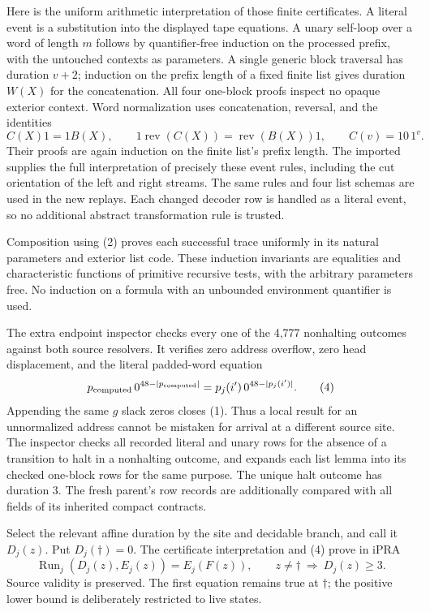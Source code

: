 \documentclass[11pt]{article}
\newcommand{\Run}{\operatorname{Run}}
\begin{document}
Here is the uniform arithmetic interpretation of those finite
certificates. A literal event is a substitution into the displayed
tape equations. A unary self-loop over a word of length $m$ follows by
quantifier-free induction on the processed prefix, with the untouched
contexts as parameters. A single generic block traversal has duration
$v+2$; induction on the prefix length of a fixed finite list gives
duration $W(X)$ for the concatenation. All four one-block proofs inspect
no opaque exterior context. Word normalization uses concatenation,
reversal, and the identities
\[
 C(X)1=1B(X),\qquad
 1\operatorname{rev}(C(X))=\operatorname{rev}(B(X))1,
 \qquad C(v)=10\,1^v.
\]
Their proofs are again induction on the finite list's prefix length.
The imported  supplies the
full interpretation of precisely these event rules, including the
cut orientation of the left and right streams. The same rules and four
list schemas are used in the new replays. Each changed decoder row is
handled as a literal event, so no additional abstract transformation rule
is trusted.

Composition using (2) proves each successful trace uniformly in its
natural parameters and exterior list code. These induction invariants
are equalities and characteristic functions of primitive recursive
tests, with the arbitrary parameters free. No induction on a formula
with an unbounded environment quantifier is used.

The extra endpoint inspector checks every one of the 4,777 nonhalting
outcomes against both source resolvers. It verifies zero address
overflow, zero head displacement, and the literal padded-word equation
\[
 p_{\rm computed}\,0^{48-|p_{\rm computed}|}
   =p_j(i')\,0^{48-|p_j(i')|}.                             \tag{4}
\]
Appending the same $g$ slack zeros closes (1). Thus a local result for
an unnormalized address cannot be mistaken for arrival at a different
source site. The inspector checks all recorded literal and unary rows
for the absence of a transition to halt in a nonhalting outcome, and
expands each list lemma into its checked one-block rows for the same
purpose. The unique halt outcome has duration 3. The fresh parent's
row records are additionally compared with all fields of its inherited
compact contracts.

Select the relevant affine duration by the site and decidable branch,
and call it $D_j(z)$. Put $D_j(\dagger)=0$.
The certificate interpretation and (4) prove in iPRA
\[
 \Run_j(D_j(z),E_j(z))=E_j(F(z)),\qquad
 z\ne\dagger\ \Longrightarrow\ D_j(z)\ge3.               \tag{5}
\]
Source validity is preserved. The first equation remains true at
$\dagger$; the positive lower bound is deliberately restricted to live
states.
\end{document}
